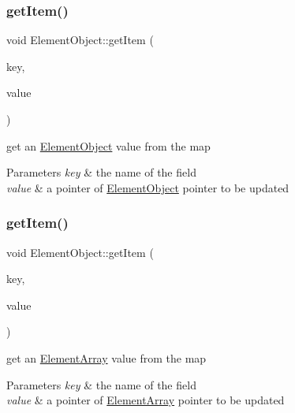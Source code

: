\subsubsection{\texorpdfstring{get\+Item()}{getItem()}\hspace{0.1cm}{\footnotesize\ttfamily [5/7]}}
{\footnotesize\ttfamily void Element\+Object\+::get\+Item (\begin{DoxyParamCaption}\item[{const char $\ast$}]{key,  }\item[{\mbox{\hyperlink{classElementObject}{Element\+Object}} $\ast$$\ast$}]{value }\end{DoxyParamCaption})}

get an \mbox{\hyperlink{classElementObject}{Element\+Object}} value from the map


\begin{DoxyParams}{Parameters}
{\em key} & the name of the field \\
\hline
{\em value} & a pointer of \mbox{\hyperlink{classElementObject}{Element\+Object}} pointer to be updated \\
\hline
\end{DoxyParams}
\mbox{\label{classElementObject_adf210b43e30ae63d08c05eb7a46b8c44}} 
\subsubsection{\texorpdfstring{get\+Item()}{getItem()}\hspace{0.1cm}{\footnotesize\ttfamily [6/7]}}
{\footnotesize\ttfamily void Element\+Object\+::get\+Item (\begin{DoxyParamCaption}\item[{const char $\ast$}]{key,  }\item[{\mbox{\hyperlink{classElementArray}{Element\+Array}} $\ast$$\ast$}]{value }\end{DoxyParamCaption})}

get an \mbox{\hyperlink{classElementArray}{Element\+Array}} value from the map


\begin{DoxyParams}{Parameters}
{\em key} & the name of the field \\
\hline
{\em value} & a pointer of \mbox{\hyperlink{classElementArray}{Element\+Array}} pointer to be updated \\
\hline
\end{DoxyParams}
\mbox{\label{classElementObject_a654bd0874175b07f4efa368f97dd82fa}} 
